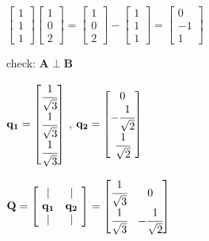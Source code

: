 \documentclass[12pt, a4paper]{article}
\begin{document}
{\begin{math}
{		\begin{bmatrix}
			1 \\
			1 \\
			1 
		\end{bmatrix}
	}
	\begin{bmatrix}
		1 \\
		0 \\
		2 
	\end{bmatrix}
	 = 
	\begin{bmatrix}
		1 \\
		0 \\
		2 
	\end{bmatrix}
	 - 
	\begin{bmatrix}
		1 \\
		1 \\
		1 
	\end{bmatrix}
	 = 
	\begin{bmatrix}
		0 \\
		-1 \\
		1 
	\end{bmatrix}
\end{math}
\par check: ${\mathbf{A}} \perp {\mathbf{B}}$
\par
\begin{math}
	{\mathbf{q_1}} = 
	\begin{bmatrix}
		\cfrac{1}{\sqrt{3}} \\
		\cfrac{1}{\sqrt{3}} \\
		\cfrac{1}{\sqrt{3}} 
	\end{bmatrix}
\end{math}
, 
\begin{math}
	{\mathbf{q_2}} = 
	\begin{bmatrix}
		0 \\
		-\cfrac{1}{\sqrt{2}} \\
		\cfrac{1}{\sqrt{2}} 
	\end{bmatrix}
\end{math}
\par 
\begin{math}
	{\mathbf{Q}} = 
	\begin{bmatrix}
		\ | & | \ \\
		\ {\mathbf{q_1}} & {\mathbf{q_2}} \ \\
		\ | & | \ 
	\end{bmatrix}
	 = 
	\begin{bmatrix}
		\cfrac{1}{\sqrt{3}} & 0 \\
		\cfrac{1}{\sqrt{3}} & -\cfrac{1}{\sqrt{2}} \\

\end{bmatrix}
\end{math}}
\end{document}
